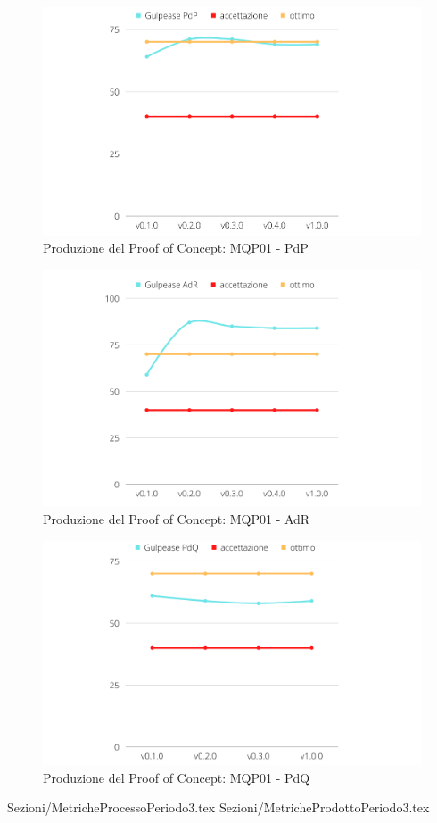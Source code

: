 \begin{figure}[H]
    \centering
    \includegraphics[scale=0.50]{Sezioni/images/poc-gulpease-pdp.png}
    \caption{Produzione del Proof of Concept: MQP01 - PdP}
\end{figure}


\begin{figure}[H]
    \centering
    \includegraphics[scale=0.50]{Sezioni/images/poc-gulpease-adr.png}
    \caption{Produzione del Proof of Concept: MQP01 - AdR}
\end{figure}


\begin{figure}[H]
    \centering
    \includegraphics[scale=0.50]{Sezioni/images/poc-gulpease-pdq.png}
    \caption{Produzione del Proof of Concept: MQP01 - PdQ}
\end{figure}

\pagebreak
 {Sezioni/MetricheProcessoPeriodo3.tex}
 {Sezioni/MetricheProdottoPeriodo3.tex}